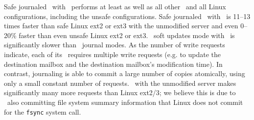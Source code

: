 Safe journaled \Kudos\ with \patchgroups\ performs at least as well as
all other \Kudos\ and all Linux configurations, including the unsafe
configurations. Safe journaled \Kudos\ with \patchgroups\ is 11--13
times faster than safe Linux ext2 or ext3 with the unmodified server
and even 0--20\% faster than even unsafe Linux ext2 or ext3.
%
\Kudos\ soft updates mode with \patchgroups\ is significantly slower
than \Kudos\ journal modes. As the number of write requests indicate,
each of its \patchgroups\ requires multiple write requests (e.g. to
update the destination mailbox and the destination mailbox's
modification time). In contrast, journaling is able to commit a large
number of copies atomically, using only a small constant number of
requests.
%
\Kudos\ with the unmodified server makes significantly many more
requests than Linux ext2/3; we believe this is due to \Kudos\ also
committing file system summary information that Linux does not commit
for the \texttt{fsync} system call.

